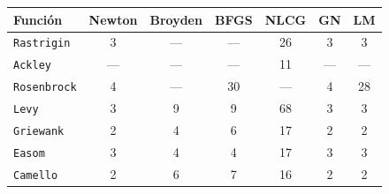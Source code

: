 \begin{tabular}{l c c c c c c}
\toprule
\rowcolor{Azul1!50}
Función & Newton & Broyden & BFGS & NLCG & GN & LM \\
\midrule
\texttt{Rastrigin} & 3 & --- & --- & 26 & 3 & 3 \\
\texttt{Ackley} & --- & --- & --- & 11 & --- & --- \\
\texttt{Rosenbrock} & 4 & --- & 30 & --- & 4 & 28 \\
\texttt{Levy} & 3 & 9 & 9 & 68 & 3 & 3 \\
\texttt{Griewank} & 2 & 4 & 6 & 17 & 2 & 2 \\
\texttt{Easom} & 3 & 4 & 4 & 17 & 3 & 3 \\
\texttt{Camello} & 2 & 6 & 7 & 16 & 2 & 2 \\
\bottomrule
\end{tabular}
